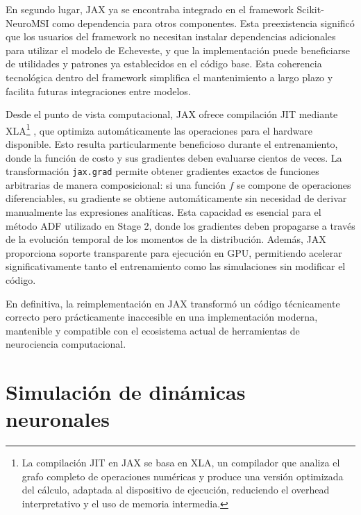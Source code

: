 En segundo lugar, JAX ya se encontraba integrado en el framework Scikit-NeuroMSI como dependencia para otros componentes. Esta preexistencia significó que los usuarios del framework no necesitan instalar dependencias adicionales para utilizar el modelo de Echeveste, y que la implementación puede beneficiarse de utilidades y patrones ya establecidos en el código base. Esta coherencia tecnológica dentro del framework simplifica el mantenimiento a largo plazo y facilita futuras integraciones entre modelos.

Desde el punto de vista computacional, JAX ofrece compilación \acrlong{JIT} mediante \acrshort{XLA}\footnote{
La compilación \acrshort{JIT} en JAX se basa en \acrfull{XLA}, un compilador que analiza el grafo completo de operaciones numéricas y produce una versión optimizada del cálculo, adaptada al dispositivo de ejecución, reduciendo el overhead interpretativo y el uso de memoria intermedia.
}
, que optimiza automáticamente las operaciones para el hardware disponible. Esto resulta particularmente beneficioso durante el entrenamiento, donde la función de costo y sus gradientes deben evaluarse cientos de veces. La transformación \texttt{jax.grad} permite obtener gradientes exactos de funciones arbitrarias de manera composicional: si una función $f$ se compone de operaciones diferenciables, su gradiente se obtiene automáticamente sin necesidad de derivar manualmente las expresiones analíticas. Esta capacidad es esencial para el método \acrshort{ADF} utilizado en Stage 2, donde los gradientes deben propagarse a través de la evolución temporal de los momentos de la distribución. Además, JAX proporciona soporte transparente para ejecución en \acrshort{GPU}, permitiendo acelerar significativamente tanto el entrenamiento como las simulaciones sin modificar el código.

En definitiva, la reimplementación en JAX transformó un código técnicamente correcto pero prácticamente inaccesible en una implementación moderna, mantenible y compatible con el ecosistema actual de herramientas de neurociencia computacional.


\section{Simulación de dinámicas neuronales}
\label{sec:impl_simulacion}

